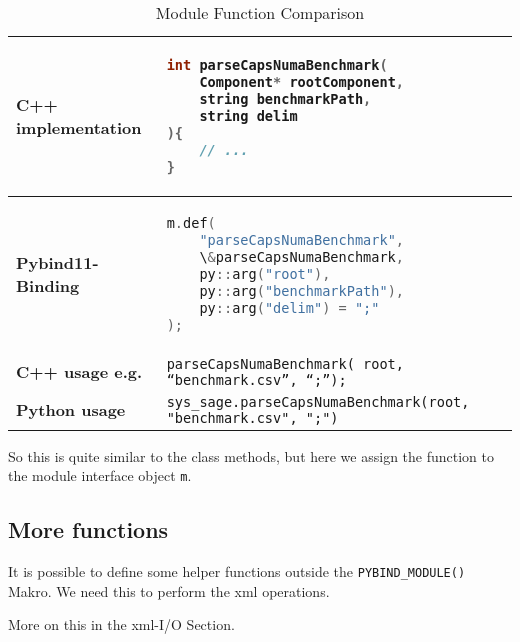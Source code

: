 \begin{table}[htbp]
\centering
\begin{tabular}{|l|l|}
\hline
\textbf{C++ implementation} &
\begin{lstlisting}[language=C++]
int parseCapsNumaBenchmark(
    Component* rootComponent,
    string benchmarkPath,
    string delim
){
    // ...
}
\end{lstlisting}
\\ \hline
\textbf{Pybind11-Binding} &
\begin{lstlisting}[language=C++]
m.def(
    "parseCapsNumaBenchmark",
    \&parseCapsNumaBenchmark,
    py::arg("root"),
    py::arg("benchmarkPath"),
    py::arg("delim") = ";"
);
\end{lstlisting}
\\ \hline
\textbf{C++ usage e.g.} &
\verb|parseCapsNumaBenchmark( root, “benchmark.csv”, “;”);| \\ \hline
\textbf{Python usage} &
\verb|sys_sage.parseCapsNumaBenchmark(root, "benchmark.csv", ";")| \\ \hline
\end{tabular}
\caption{Module Function Comparison}
\label{tab:module_functions}
\end{table}

So this is quite similar to the class methods, but here we assign the function to the module interface object \verb|m|.

\subsection{More functions}

It is possible to define some helper functions outside the \verb|PYBIND_MODULE()| Makro. We need this to perform the xml operations.

More on this in the xml-I/O Section.